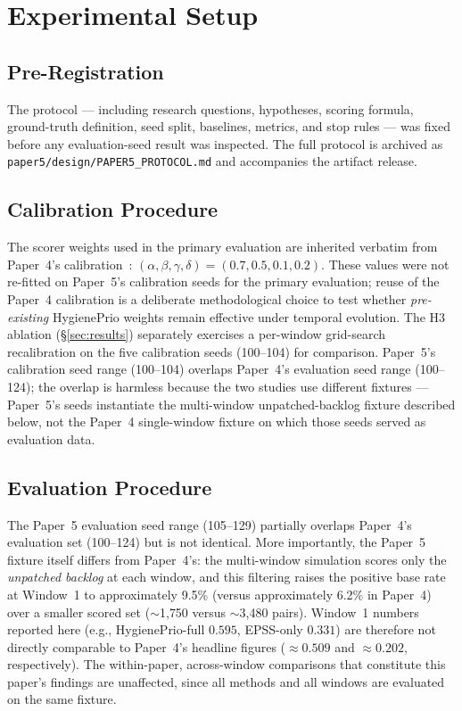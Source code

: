 \section{Experimental Setup}

\subsection{Pre-Registration}

The protocol --- including research questions, hypotheses, scoring formula, ground-truth definition, seed split, baselines, metrics, and stop rules --- was fixed before any evaluation-seed result was inspected. The full protocol is archived as \texttt{paper5/design/PAPER5\_PROTOCOL.md} and accompanies the artifact release.

\subsection{Calibration Procedure}

The scorer weights used in the primary evaluation are inherited verbatim from Paper~4's calibration~\cite{paper4hygieneprio}: $(\alpha, \beta, \gamma, \delta) = (0.7, 0.5, 0.1, 0.2)$. These values were not re-fitted on Paper~5's calibration seeds for the primary evaluation; reuse of the Paper~4 calibration is a deliberate methodological choice to test whether \textit{pre-existing} HygienePrio weights remain effective under temporal evolution. The H3 ablation (\S\ref{sec:results}) separately exercises a per-window grid-search recalibration on the five calibration seeds (100--104) for comparison. Paper~5's calibration seed range (100--104) overlaps Paper~4's evaluation seed range (100--124); the overlap is harmless because the two studies use different fixtures --- Paper~5's seeds instantiate the multi-window unpatched-backlog fixture described below, not the Paper~4 single-window fixture on which those seeds served as evaluation data.

\subsection{Evaluation Procedure}

The Paper~5 evaluation seed range (105--129) partially overlaps Paper~4's evaluation set (100--124) but is not identical. More importantly, the Paper~5 fixture itself differs from Paper~4's: the multi-window simulation scores only the \textit{unpatched backlog} at each window, and this filtering raises the positive base rate at Window~1 to approximately 9.5\% (versus approximately 6.2\% in Paper~4) over a smaller scored set ($\sim$1{,}750 versus $\sim$3{,}480 pairs). Window~1 numbers reported here (e.g., HygienePrio-full $0.595$, EPSS-only $0.331$) are therefore not directly comparable to Paper~4's headline figures ($\approx 0.509$ and $\approx 0.202$, respectively). The within-paper, across-window comparisons that constitute this paper's findings are unaffected, since all methods and all windows are evaluated on the same fixture.

